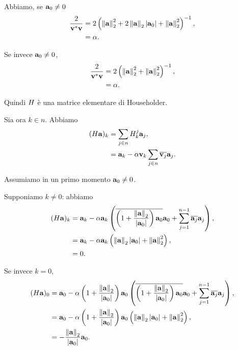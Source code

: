Abbiamo, se $\mathbf{a}_0 \neq 0$
\begin{align*}
  \frac{2}{\HermitianTransposed{\Vector}\Vector}
  &= 2 \left ( \Norm{\VarVarVector}[2]^2
    + 2 \Norm{\VarVarVector}[2]\AbsoluteValue{\VarVarVector_0}
    + \Norm{\VarVarVector}[2]^2 \right )^{-1},\\
  &= \Scalar.
\end{align*}
\par Se invece $\mathbf{a}_0 \neq 0$,
\begin{align*}
  \frac{2}{\HermitianTransposed{\Vector}\Vector}
  &= 2 \left ( \Norm{\VarVarVector}[2]^2
    + \Norm{\VarVarVector}[2]^2 \right )^{-1},\\
  &= \Scalar.
\end{align*}
\par Quindi $H$ \`e una matrice elementare di Householder.
\par Sia ora $k \in n$. Abbiamo
\begin{align*}
  (H\mathbf{a})_k 
  &= \sum_{j \in n} H_k^j \mathbf{a}_j,\\
  &= \mathbf{a}_k - \alpha \mathbf{v}_k \sum_{j \in n}
    \overline{\mathbf{v}_j}
    \mathbf{a}_j.
\end{align*}
\par Assumiamo in un primo momento $\mathbf{a}_0 \neq 0$.
\par Supponiamo $k \neq 0$: abbiamo
\begin{align*}
  (\HouseholderElementaryMatrix\VarVarVector)_k
  &= \VarVarVector_k - \Scalar \VarVarVector_k \left (
    \Conjugate{
      \left ( 1 + \frac{\Norm{\VarVarVector}[2]}{\AbsoluteValue{\VarVarVector_0}} \right )
        \VarVarVector_0}
    \VarVarVector_0
    + \sum_{j = 1}^{n - 1}
    \Conjugate{\VarVarVector_j}
    \VarVarVector_j \right ),\\
  &= \VarVarVector_k - \Scalar \VarVarVector_k \left (
      \Norm{\VarVarVector}[2] \AbsoluteValue{\VarVarVector_0}
    + \Norm{\VarVarVector}[2]^2 \right ),\\
  &= 0.
\end{align*}
\par Se invece $k = 0$,
\begin{align*}
  (\HouseholderElementaryMatrix\VarVarVector)_0
  &= \VarVarVector_0 - \Scalar
    \left ( 1 + \frac{\Norm{\VarVarVector}[2]}{\AbsoluteValue{\VarVarVector_0}} \right )
    \VarVarVector_0 \left (
    \Conjugate{
      \left ( 1 + \frac{\Norm{\VarVarVector}[2]}{\AbsoluteValue{\VarVarVector_0}} \right )
        \VarVarVector_0}
    \VarVarVector_0
    + \sum_{j = 1}^{n - 1}
    \Conjugate{\VarVarVector_j}
    \VarVarVector_j \right ),\\
  &= \VarVarVector_0 - \Scalar
    \left( 1 + \frac{\Norm{\VarVarVector}[2]}{\AbsoluteValue{\VarVarVector_0}} \right )
      \VarVarVector_0 \left (
      \Norm{\VarVarVector}[2] \AbsoluteValue{\VarVarVector_0}
    + \Norm{\VarVarVector}[2]^2 \right ),\\
  &= - \frac{\Norm{\VarVarVector}[2]}{\AbsoluteValue{\VarVarVector_0}} \VarVarVector_0.
\end{align*}
